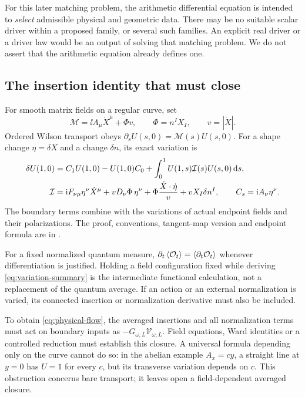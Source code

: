 For this later matching problem, the arithmetic differential equation
is intended to \emph{select} admissible
physical and geometric data. There may be no suitable scalar
driver within a proposed family, or several such families. An
explicit real driver or a driver law would be an output of solving
that matching problem. We do not assert that the arithmetic
equation already defines one.

\subsection{The insertion identity that must close}

For smooth matrix fields on a regular curve, set
\[
 \mathcal M=\ii A_\mu\dot X^\mu+\Phi v,\qquad
 \Phi=n^I X_I,\qquad v=|\dot X|.
\]
Ordered Wilson transport obeys
$\partial_sU(s,0)=\mathcal M(s)U(s,0)$.
For a shape change $\eta=\delta X$ and a change $\delta n$,
its exact variation is
\begin{align}\label{eq:variation-summary}
 \delta U(1,0)
 &=C_1U(1,0)-U(1,0)C_0
   +\int_0^1U(1,s)\mathcal I(s)U(s,0)\,\mathrm d s,\\
 \mathcal I
 &=\mathrm i F_{\nu\mu}\eta^\nu\dot X^\mu
   +vD_\nu\Phi\,\eta^\nu
   +\Phi\frac{\dot X\cdot\dot\eta}{v}
   +vX_I\delta n^I,\qquad C_s=\mathrm i A_\nu\eta^\nu.
 \notag
\end{align}
The boundary terms combine with the variations of actual endpoint
fields and their polarizations. The proof, conventions, tangent-map
version and endpoint formula are in \cite[Section~S4]{Supplement}.

For a fixed normalized quantum measure,
$\partial_t\left\langle\mathcal O_t\right\rangle=\left\langle\partial_t\mathcal O_t\right\rangle$
whenever differentiation is justified. Holding a field configuration
fixed while deriving \eqref{eq:variation-summary} is the intermediate
functional calculation, not a replacement of the quantum average.
If an action or an external normalization is varied, its connected
insertion or normalization derivative must also be included.

To obtain \eqref{eq:physical-flow}, the averaged insertions and all
normalization terms must act on boundary inputs as
$-G_{\omega,L}\mathcal V_{\omega,L}$. Field equations, Ward
identities or a controlled reduction must establish this closure.
A universal formula depending only on the curve cannot do so:
in the abelian example $A_x=cy$, a straight line at $y=0$ has
$U=1$ for every $c$, but its transverse variation depends on $c$.
This obstruction concerns bare transport; it leaves open a
field-dependent averaged closure.

